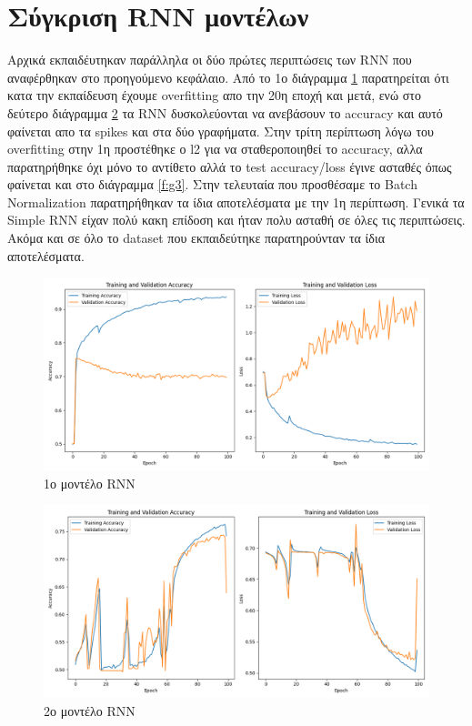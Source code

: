 \section{Σύγκριση RNN μοντέλων}

Αρχικά εκπαιδέυτηκαν παράλληλα οι δύο πρώτες περιπτώσεις των RNN που αναφέρθηκαν στο προηγούμενο κεφάλαιο. Από το 1ο διάγραμμα
\ref{f:g1} παρατηρείται ότι κατα την εκπαίδευση έχουμε overfitting απο την 20η εποχή και μετά, ενώ στο δεύτερο διάγραμμα \ref{f:g2} τα RNN 
δυσκολεύονται να ανεβάσουν το accuracy και αυτό φαίνεται απο τα spikes και στα δύο γραφήματα. Στην τρίτη περίπτωση λόγω του overfitting στην 1η προστέθηκε ο l2 για να σταθεροποιηθεί το accuracy, αλλα παρατηρήθηκε όχι μόνο το αντίθετο αλλά το test accuracy/loss έγινε ασταθές όπως φαίνεται και στο διάγραμμα \ref{f:g3}. Στην τελευταία που προσθέσαμε το Batch Normalization παρατηρήθηκαν τα ίδια αποτελέσματα με την 1η περίπτωση.
Γενικά τα Simple RNN είχαν πολύ κακη επίδοση και ήταν πολυ ασταθή σε όλες τις περιπτώσεις. Ακόμα και σε όλο το dataset που εκπαιδεύτηκε παρατηρούνταν τα ίδια αποτελέσματα.


\begin{figure}[ht]
	\centering
	\includegraphics[width=1\linewidth]{Results/RNN/rnn1.png}
	\caption{ 1ο μοντέλο RNN }
	\label{f:g1}	
\end{figure}


\begin{figure}[ht]
	\centering
	\includegraphics[width=1\linewidth]{Results/RNN/rnn2.png}
	\caption{ 2ο μοντέλο RNN }
	\label{f:g2}	
\end{figure}

